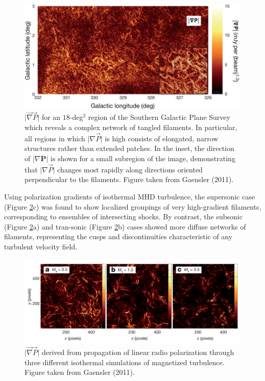 \documentclass[a4paper,10pt]{article}
\begin{document}
\begin{figure}[h]
\begin{center}
\includegraphics[width=12cm]{figures/delP.jpg}
\caption{\footnotesize{$\lvert\vec\nabla \vec{P}\rvert$ for an $18$-deg$^2$ region of the Southern Galactic Plane Survey which reveals a complex network of tangled filaments. In particular, all regions in which $\lvert\nabla \vec{P}\rvert$ is high consists of elongated, narrow structures rather than extended patches. In the inset, the direction of $\lvert\nabla\mathbf{P}\rvert$ is shown for a small subregion of the image, demonstrating that $\lvert\nabla\vec{P}\rvert$ changes most rapidly along directions oriented perpendicular to the filaments. Figure taken from Gaensler (2011).}}
\label{figure:delP}
\end{center}
\end{figure}

{\noindent}Using polarization gradients of isothermal MHD turbulence, the supersonic case (Figure \ref{figure:delPmach}c) was found to show localized groupings of very high-gradient filaments, corresponding to ensembles of intersecting shocks. By contrast, the subsonic (Figure \ref{figure:delPmach}a) and tran-sonic (Figure \ref{figure:delPmach}b) cases showed more diffuse networks of filaments, representing the cusps and discontinuities characteristic of any turbulent velocity field. 

\begin{figure}[h]
\begin{center}
\includegraphics[width=12cm]{figures/delP_mach.png}
\caption{\footnotesize{$\lvert\vec\nabla \vec{P}\rvert$ derived from propagation of linear radio polarization through three different isothermal simulations of magnetized turbulence. Figure taken from Gaensler (2011).}}
\label{figure:delPmach}
\end{center}
\end{figure}
\end{document}
